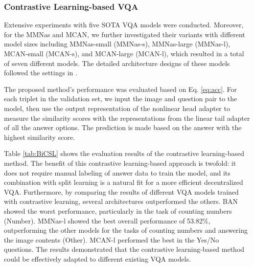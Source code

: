 \documentclass[letterpaper]{article} %
\begin{document}

\subsubsection{Contrastive Learning-based VQA}

Extensive experiments with five SOTA VQA models were conducted. Moreover, for the MMNas and MCAN, we further investigated their variants with different model sizes including MMNas-small (MMNas-s), MMNas-large (MMNas-l), MCAN-small (MCAN-s), and MCAN-large (MCAN-l), which resulted in a total of seven different models. The detailed architecture designs of these models followed the settings in \cite{mcan,mmnas}.

The proposed method's performance was evaluated based on Eq. \ref{eq:acc}. For each triplet in the validation set, we input the image and question pair to the model, then use the output representation of the nonlinear head adapter to measure the similarity scores with the representations from the linear tail adapter of all the answer options. The prediction is made based on the answer with the highest similarity score.

Table \ref{tab:BiCSL} shows the evaluation results of the contrastive learning-based method. The benefit of this contrastive learning-based approach is twofold: it does not require manual labeling of answer data to train the model, and its combination with split learning is a natural fit for a more efficient decentralized VQA. Furthermore, by comparing the results of different VQA models trained with contrastive learning, several architectures outperformed the others. BAN showed the worst performance, particularly in the task of counting numbers (Number). MMNas-l showed the best overall performance of 53.82\%, outperforming the other models for the tasks of counting numbers and answering the image contents (Other). MCAN-l performed the best in the Yes/No questions. The results demonstrated that the contrastive learning-based method could be effectively adapted to different existing VQA models.
\end{document}
